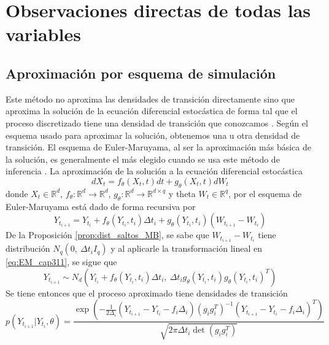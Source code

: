 \section{Observaciones directas de todas las variables}

\subsection{Aproximación por esquema de simulación}

Este método no aproxima las densidades de transición directamente 
sino que aproxima la solución de la ecuación diferencial 
estocástica de forma tal que el proceso discretizado tiene 
una densidad de transición que conozcamos 
\cite{iacusSimulationInferenceStochastic2008}. Según el esquema
usado para aproximar la solución, obtenemos una u otra densidad de 
transición. El esquema de Euler-Maruyama, al ser la aproximación 
más básica de la solución, es generalmente el más elegido 
cuando se usa este método de inferencia \cite{ozdemircalikusuFittingItoStochastic2021}.
La aproximación de la solución a la ecuación diferencial estocástica
\begin{equation*}
    dX_t = f_\theta(X_t,t)dt + g_\theta(X_t,t)dW_t
\end{equation*}
donde $X_t\in \mathbb R^d$, $f_\theta:\mathbb R^d \to 
\mathbb R^d$, $g_\theta: \mathbb R^d \to \mathbb R^{d\times q}$ y theta
$W_t\in \mathbb R^q$, por el esquema de Euler-Maruyama está 
dado de forma recursiva por 
\begin{equation}\label{eq:EM_cap311}
    Y_{t_{i+1}}= Y_{t_i} + f_\theta(Y_{t_i},t_i)\Delta t_i + 
g_\theta(Y_{t_i},t_i)(W_{t_{i+1}}-W_{t_i})
\end{equation}
De la Proposición \ref{prop:dist_saltos_MB}, se sabe que 
$W_{t_{i+1}}-W_{t_i}$ tiene distribución $N_q(0,\ \Delta t_i I_q)$ y 
al aplicarle la transformación lineal en \ref{eq:EM_cap311}, 
se sigue que
$$Y_{t_{i+1}}\sim N_d\left(Y_{t_i} + f_\theta(Y_{t_i},t_i)\Delta t_i,\ 
\Delta t_i g_\theta(Y_{t_i},t_i)g_\theta(Y_{t_i},t_i)^T\right)$$
Se tiene entonces que el proceso aproximado tiene densidades de 
transición 
$$p(Y_{t_{i+1}}|Y_{t_i},\theta) = \frac{\exp\left(-\frac{1}{2\Delta_i}(Y_{t_{i+1}}-
Y_{t_i}-f_i\Delta_i)(g_ig_i^T)^{-1}(Y_{t_{i+1}}-
Y_{t_i}-f_i\Delta_i)^T \right)}{\sqrt{2\pi 
\Delta t_i \det(g_ig_i^T)}}$$

